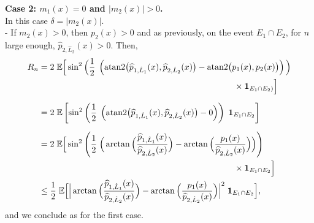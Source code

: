 \documentclass[11pt,a4paper,openany]{article}
\newcommand{\Atan}{\mbox{atan2}}
\def\E{\mathbb{E}}
\begin{document}
\noindent
{\textbf{Case 2: $m_1(x) = 0$ and $|m_2(x)|>0$.}
	\\[0.2cm]   
	In this case $\delta=|m_2(x)|$.\\
	- If $m_2(x)>0$, then $p_{2}(x) > 0$ and as previously, on the event $E_1 \cap  E_2 $, for $n$ large enough, $ \widehat{p}_{2, \hat L_2}(x)>0$. Then,
	\begin{align*}
		R_n & = 2 \hspace{0.1cm}  \E \Big[ \sin^2 \Big( \frac{1}{2}  \hspace{0.1cm}    \left (  \Atan \big( \widehat{p}_{1, \hat L_1}(x) , \widehat{p}_{2, \hat L_2}(x)\big)  -  \Atan \big( p_{1}(x), p_{2}(x)\big)  \right ) \Big) 
		\\
		& \hspace{8cm} \times  \mathbf{1}_{ E_1 \cap  E_2) } \Big]
		\\[0.2cm]  
		&= 2 \hspace{0.1cm}  \E \left [ \sin^2 \left ( \frac{1}{2} \hspace{0.1cm}   \left (  \Atan \big( \widehat{p}_{1, \hat L_1}(x) , \widehat{p}_{2, \hat L_2}(x)\big)  -  0  \right ) \right) \hspace{0.1cm}   \mathbf{1}_{E_1 \cap  E_2 } \right]
		\\[0.2cm]   
		&= 2  \hspace{0.1cm}  \E \Big[ \sin^2 \Bigg( \frac{1}{2}  \hspace{0.1cm}    \Big(  \arctan \Big( \dfrac{ \widehat{p}_{1, \hat L_1}(x)}{ \widehat{p}_{2, \hat L_2}(x)}  \Big)  -  \arctan \Big( \dfrac{ p_{1}(x)}{ \widehat{p}_{2, \hat L_2}(x)}  \Big) \Big) \Bigg) \\
		& \hspace{8cm} \times    \mathbf{1}_{E_1 \cap  E_2 } \Big]  
		\\  
		&\leq  \frac{1}{2}  \hspace{0.1cm}  \E  \Big[ \Big| \arctan \Big( \dfrac{ \widehat{p}_{1, \hat L_1}(x)}{ \widehat{p}_{2, \hat L_2}(x)}  \Big)  -  \arctan \Big( \dfrac{p_{1}(x)}{ \widehat{p}_{2, \hat L_2}(x)} \Big) \Big|^{2} \hspace{0.1cm}    \mathbf{1}_{ E_1 \cap  E_2 } \Big],     
	\end{align*}
	and we conclude as for the first case.
	
}
\end{document}
